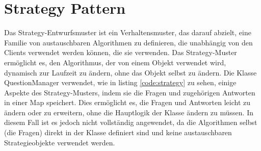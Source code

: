 \section{Strategy Pattern}
Das Strategy-Entwurfsmuster ist ein Verhaltensmuster, das darauf abzielt, eine Familie von austauschbaren Algorithmen zu definieren, die unabhängig von den Clients verwendet werden können, die sie verwenden. Das Strategy-Muster ermöglicht es, den Algorithmus, der von einem Objekt verwendet wird, dynamisch zur Laufzeit zu ändern, ohne das Objekt selbst zu ändern. Die Klasse QuestionManager verwendet, wie in listing \ref{code:strategy} zu sehen, einige Aspekte des Strategy-Musters, indem sie die Fragen und zugehörigen Antworten in einer Map speichert. Dies ermöglicht es, die Fragen und Antworten leicht zu ändern oder zu erweitern, ohne die Hauptlogik der Klasse ändern zu müssen.
In diesem Fall ist es jedoch nicht vollständig angewendet, da die Algorithmen selbst (die Fragen) direkt in der Klasse definiert sind und keine austauschbaren Strategieobjekte verwendet werden.

